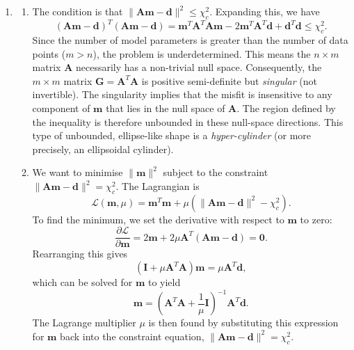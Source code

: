 \documentclass[a4paper,10pt]{paper}
\begin{document}
\begin{enumerate}
\item
\begin{enumerate}
    \item The condition is that $\|\mathbf{A}\mathbf{m}-\mathbf{d}\|^{2} \le \chi^{2}_{c}$. Expanding this, we have
    \begin{equation*}
        (\mathbf{A}\mathbf{m}-\mathbf{d})^{T}(\mathbf{A}\mathbf{m}-\mathbf{d}) = \mathbf{m}^{T}\mathbf{A}^{T}\mathbf{A}\mathbf{m}-2\mathbf{m}^{T}\mathbf{A}^{T}\mathbf{d}+\mathbf{d}^{T}\mathbf{d} \le \chi_{c}^{2}.
    \end{equation*}
    Since the number of model parameters is greater than the number of data points ($m>n$), the problem is underdetermined. This means the $n \times m$ matrix $\mathbf{A}$ necessarily has a non-trivial null space.
     Consequently, the $m \times m$ matrix $\mathbf{G} = \mathbf{A}^{T}\mathbf{A}$ is positive semi-definite but \emph{singular} (not invertible). The singularity implies that the misfit is insensitive to any component
     of $\mathbf{m}$ that lies in the null space of $\mathbf{A}$. The region defined by the inequality is therefore unbounded in these null-space directions. This type of unbounded, ellipse-like shape is a
     \emph{hyper-cylinder} (or more precisely, an ellipsoidal cylinder).

    \item We want to minimise $\|\mathbf{m}\|^{2}$ subject to the constraint $\|\mathbf{A}\mathbf{m}-\mathbf{d}\|^{2} = \chi^{2}_{c}$. The Lagrangian is
    \begin{equation*}
        \mathcal{L}(\mathbf{m},\mu)=\mathbf{m}^{T}\mathbf{m}+\mu(\|\mathbf{A}\mathbf{m}-\mathbf{d}\|^{2}-\chi^{2}_{c}).
    \end{equation*}
    To find the minimum, we set the derivative with respect to $\mathbf{m}$ to zero:
    \begin{equation*}
        \frac{\partial\mathcal{L}}{\partial\mathbf{m}} = 2\mathbf{m}+2\mu\mathbf{A}^{T}(\mathbf{A}\mathbf{m}-\mathbf{d}) = \mathbf{0}.
    \end{equation*}
    Rearranging this gives
    \begin{equation*}
        (\mathbf{I}+\mu\mathbf{A}^{T}\mathbf{A})\mathbf{m}=\mu\mathbf{A}^{T}\mathbf{d},
    \end{equation*}
    which can be solved for $\mathbf{m}$ to yield
    \begin{equation*}
        \mathbf{m}=\left( \mathbf{A}^{T}\mathbf{A} + \frac{1}{\mu}\mathbf{I}\right)^{-1}\mathbf{A}^{T}\mathbf{d}.
    \end{equation*}
    The Lagrange multiplier $\mu$ is then found by substituting this expression for $\mathbf{m}$ back into the constraint equation, $\|\mathbf{A}\mathbf{m}-\mathbf{d}\|^{2} = \chi^{2}_{c}$.


\end{enumerate}
\end{enumerate}
\end{document}
